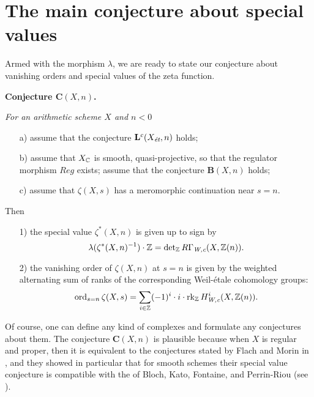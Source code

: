 \documentclass{article}
\theoremstyle{plain}
\begin{document}
\pagebreak


\section{The main conjecture about special values}

Armed with the morphism $\lambda$, we are ready to state our conjecture about
vanishing orders and special values of the zeta function.

\vspace{1em}

\noindent\textbf{Conjecture $\mathbf{C} (X,n)$.} {\it For an arithmetic scheme $X$ and $n < 0$

\begin{enumerate}
\item[a)] assume that the conjecture $\mathbf{L}^c (X_\text{\it ét}, n)$ holds;

\item[b)] assume that $X_{\mathbb{C}}$ is smooth, quasi-projective, so that the regulator
  morphism $Reg$ exists; assume that the conjecture $\mathbf{B}(X, n)$ holds;

\item[c)] assume that $\zeta (X, s)$ has a meromorphic continuation near
  $s = n$.
\end{enumerate}

Then

\begin{enumerate}
\item[1)] the special value $\zeta^* (X, n)$ is given up to sign by
  $$\lambda (\zeta^* (X, n)^{-1}) \cdot \mathbb{Z} = \det\nolimits_{\mathbb{Z}} R\Gamma_\text{\it W,c} (X, \mathbb{Z}(n)).$$

\item[2)] the vanishing order of $\zeta (X, n)$ at $s = n$ is given by the
  weighted alternating sum of ranks of the corresponding Weil-étale cohomology
  groups:
  $$\operatorname{ord}_{s=n} \zeta (X,s) = \sum_{i\in\mathbb{Z}} (-1)^i \cdot i\cdot \operatorname{rk}_{\mathbb{Z}} H^i_\text{\it W,c} (X, \mathbb{Z}(n)).$$
\end{enumerate}}

\vspace{1em}

Of course, one can define any kind of complexes and formulate any conjectures
about them. The conjecture $\mathbf{C} (X,n)$ is plausible because when $X$ is
regular and proper, then it is equivalent to the conjectures stated by Flach and
Morin in \cite{Flach-Morin-16}, and they showed in particular that for smooth
schemes their special value conjecture is compatible with the
 of Bloch, Kato, Fontaine, and Perrin-Riou
(see \cite{Fontaine-Perrin-Riou}).
\end{document}
